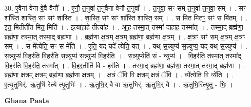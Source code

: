 \documentclass[17pt]{extarticle}
\begin{document}
30. ए॒वैना॑ वेना वे॒वै वैनौ᳚ । . ए॒नौ॒ त॒नुवा॑ त॒नुवै॑ना वेनौ त॒नुवा᳚ । . त॒नुवा॒ सꣳ सम् त॒नुवा॑ त॒नुवा॒ सम् । . सꣳ शा᳚स्ति शास्ति॒ सꣳ सꣳ शा᳚स्ति । . शा॒स्ति॒ सꣳ सꣳ शा᳚स्ति शास्ति॒ सम् । . स मि॑त मितꣳ॒॒ सꣳ स मि॑तम् । . इ॒त॒ मितीती॑त मित॒ मिति॑ । . इत्या॑हा॒हे तीत्या॑ह । . आ॒ह॒ तस्मा॒त् तस्मा॑ दाहाह॒ तस्मा᳚त् । . तस्मा॒द् ब्रह्म॑णा॒ ब्रह्म॑णा॒ तस्मा॒त् तस्मा॒द् ब्रह्म॑णा । . ब्रह्म॑णा क्ष॒त्रम् क्ष॒त्रम् ब्रह्म॑णा॒ ब्रह्म॑णा क्ष॒त्रम् । . क्ष॒त्रꣳ सꣳ सम् क्ष॒त्रम् क्ष॒त्रꣳ सम् । . स मे᳚त्येति॒ सꣳ स मे॑ति । . ए॒ति॒ यद् यदे᳚ त्येति॒ यत् । . यथ् स॒न्न्युप्य॑ स॒न्न्युप्य॒ यद् यथ् स॒न्न्युप्य॑ । . स॒न्न्युप्य॑ वि॒हर॑ति वि॒हर॑ति स॒न्न्युप्य॑ स॒न्न्युप्य॑ वि॒हर॑ति । . स॒न्न्युप्येति॑ सं - न्युप्य॑ । . वि॒हर॑ति॒ तस्मा॒त् तस्मा᳚द् वि॒हर॑ति वि॒हर॑ति॒ तस्मा᳚त् । . वि॒हर॒तीति॑ वि - हर॑ति । . तस्मा॒द् ब्रह्म॑णा॒ ब्रह्म॑णा॒ तस्मा॒त् तस्मा॒द् ब्रह्म॑णा । . ब्रह्म॑णा क्ष॒त्रम् क्ष॒त्रम् ब्रह्म॑णा॒ ब्रह्म॑णा क्ष॒त्रम् । . क्ष॒त्रं ॅवि वि क्ष॒त्रम् क्ष॒त्रं ॅवि । . व्ये᳚त्येति॒ वि व्ये॑ति । . ए॒त्यृ॒तुभिर्॑. ऋ॒तुभि॑ रेत्ये त्यृ॒तुभिः॑ । . ऋ॒तुभि॒र् वै वा ऋ॒तुभिर्॑. ऋ॒तुभि॒र् वै । . ऋ॒तुभि॒रित्यृ॒तु - भिः॒ । \newline

\textbf{Ghana Paata } \newline
\end{document}
